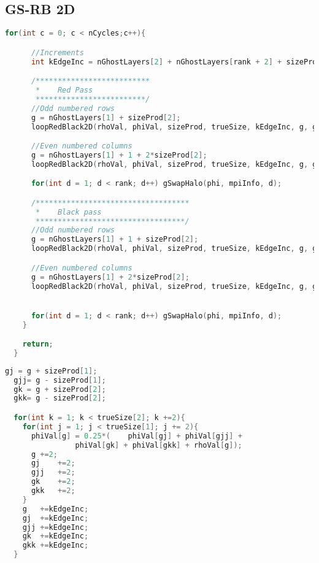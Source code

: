 \subsection{GS-RB 2D}
\label{sec:GS_RB_2D}
\begin{lstlisting}[language=c, caption = Main loop]
    for(int c = 0; c < nCycles;c++){

      //Increments
      int kEdgeInc = nGhostLayers[2] + nGhostLayers[rank + 2] + sizeProd[2];

      /**************************
       *	Red Pass
       *************************/
      //Odd numbered rows
      g = nGhostLayers[1] + sizeProd[2];
      loopRedBlack2D(rhoVal, phiVal, sizeProd, trueSize, kEdgeInc, g, gj, gjj, gk, gkk);

      //Even numbered columns
      g = nGhostLayers[1] + 1 + 2*sizeProd[2];
      loopRedBlack2D(rhoVal, phiVal, sizeProd, trueSize, kEdgeInc, g, gj, gjj, gk, gkk);

      for(int d = 1; d < rank; d++) gSwapHalo(phi, mpiInfo, d);

      /***********************************
       *	Black pass
       **********************************/
      //Odd numbered rows
      g = nGhostLayers[1] + 1 + sizeProd[2];
      loopRedBlack2D(rhoVal, phiVal, sizeProd, trueSize, kEdgeInc, g, gj, gjj, gk, gkk);

      //Even numbered columns
      g = nGhostLayers[1] + 2*sizeProd[2];
      loopRedBlack2D(rhoVal, phiVal, sizeProd, trueSize, kEdgeInc, g, gj, gjj, gk, gkk);


      for(int d = 1; d < rank; d++) gSwapHalo(phi, mpiInfo, d);
    }

    return;
  }
\end{lstlisting}

\begin{lstlisting}[language=c, caption = Loop through grid]
  gj = g + sizeProd[1];
  gjj= g - sizeProd[1];
  gk = g + sizeProd[2];
  gkk= g - sizeProd[2];

  for(int k = 1; k < trueSize[2]; k +=2){
    for(int j = 1; j < trueSize[1]; j += 2){
      phiVal[g] = 0.25*(	phiVal[gj] + phiVal[gjj] +
                phiVal[gk] + phiVal[gkk] + rhoVal[g]);
      g	+=2;
      gj	+=2;
      gjj	+=2;
      gk	+=2;
      gkk	+=2;
    }
    g	+=kEdgeInc;
    gj	+=kEdgeInc;
    gjj	+=kEdgeInc;
    gk	+=kEdgeInc;
    gkk	+=kEdgeInc;
  }
\end{lstlisting}

\newpage
